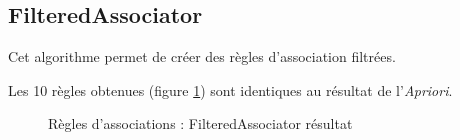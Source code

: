 \subsection{FilteredAssociator}

Cet algorithme permet de créer des règles d'association filtrées.

Les 10 règles obtenues (figure \ref{filtered}) sont identiques au résultat de l'\textit{Apriori}.

\begin{figure}[H]
    \centering
    \caption{Règles d'associations : FilteredAssociator résultat}
    \label{filtered}
\end{figure}
